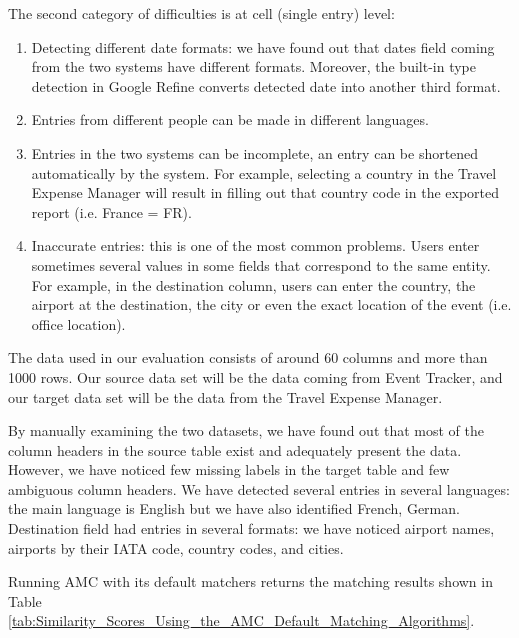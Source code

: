 The second category of difficulties is at cell (single entry) level:

\begin{enumerate}
\item  Detecting different date formats: we have found out that dates field coming from the two systems have different formats. Moreover, the built-in type detection in Google Refine converts detected date into another third format.

\item  Entries from different people can be made in different languages.

\item  Entries in the two systems can be incomplete, an entry can be shortened automatically by the system. For example, selecting a country in the Travel Expense Manager will result in filling out that country code in the exported report (i.e. France = FR).

\item  Inaccurate entries: this is one of the most common problems. Users enter sometimes several values in some fields that correspond to the same entity. For example, in the destination column, users can enter the country, the airport at the destination, the city or even the exact location of the event (i.e. office location).
\end{enumerate}

The data used in our evaluation consists of around 60 columns and more than 1000 rows. Our source data set will be the data coming from Event Tracker, and our target data set will be the data from the Travel Expense Manager.

By manually examining the two datasets, we have found out that most of the column headers in the source table exist and adequately present the data. However, we have noticed few missing labels in the target table and few ambiguous column headers. We have detected several entries in several languages: the main language is English but we have also identified French, German. Destination field had entries in several formats: we have noticed airport names, airports by their IATA code, country codes, and cities.

Running AMC with its default matchers returns the matching results shown in Table \ref{tab:Similarity_Scores_Using_the_AMC_Default_Matching_Algorithms}.


